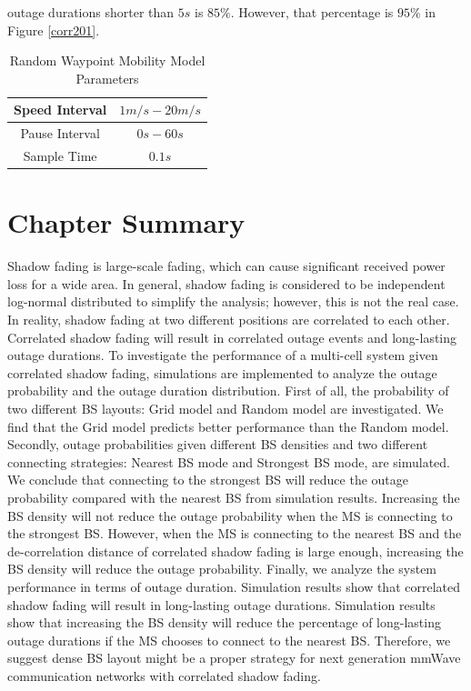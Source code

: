 outage durations shorter than $5s$ is $85\%$. However, that percentage is $95\%$ in Figure \ref{corr201}.
 \begin{table}
 \centering
 \caption{\label{RWP}Random Waypoint Mobility Model Parameters}

 \begin{tabular}{|c|c|}

 \hline
 Speed Interval & $1m/s - 20m/s$\\
 \hline
 Pause Interval & $0s - 60s$\\
 \hline
 Sample Time & $0.1s$\\
 \hline
 \end{tabular}

 \end{table}

 \section{Chapter Summary}
 \label{4:Conclusion}
 Shadow fading is large-scale fading, which can cause significant received power loss for a wide area. In general, shadow fading is considered to be independent log-normal distributed to simplify the analysis; however, this is not the real case. In reality, shadow fading at two different positions are correlated to each other. Correlated shadow fading will result in correlated outage events and long-lasting outage durations. To investigate the performance of a multi-cell system given correlated shadow fading, simulations are implemented to analyze the outage probability and the outage duration distribution. First of all, the probability of two different BS layouts: Grid model and Random model are investigated. We find that the Grid model predicts better performance than the Random model. Secondly, outage probabilities given different BS densities and two different connecting strategies: Nearest BS mode and Strongest BS mode, are simulated. We conclude that connecting to the strongest BS will reduce the outage probability compared with the nearest BS from simulation results. Increasing the BS density will not reduce the outage probability when the MS is connecting to the strongest BS. However, when the MS is connecting to the nearest BS and the de-correlation distance of correlated shadow fading is large enough, increasing the BS density will reduce the outage probability.  Finally, we analyze the system performance in terms of outage duration. Simulation results show that correlated shadow fading will result in long-lasting outage durations. Simulation results show that increasing the BS density will reduce the percentage of long-lasting outage durations if the MS chooses to connect to the nearest BS. Therefore, we suggest dense BS layout might be a proper strategy for next generation mmWave communication networks with correlated shadow fading.
 

